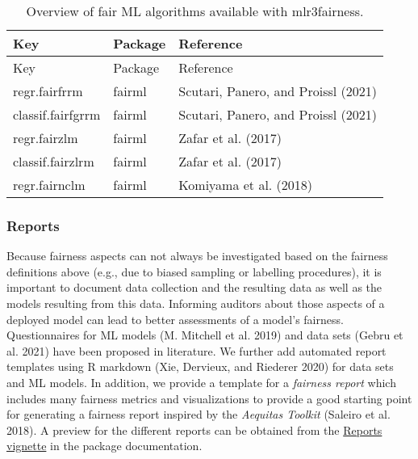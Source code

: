 \begin{longtable}[]{@{}lll@{}}
\caption{\label{tab:fairlearns} Overview of fair ML algorithms available with mlr3fairness.}\tabularnewline
\toprule\noalign{}
Key & Package & Reference \\
\midrule\noalign{}
\endfirsthead
\toprule\noalign{}
Key & Package & Reference \\
\midrule\noalign{}
\endhead
\bottomrule\noalign{}
\endlastfoot
regr.fairfrrm & fairml & Scutari, Panero, and Proissl (2021) \\
classif.fairfgrrm & fairml & Scutari, Panero, and Proissl (2021) \\
regr.fairzlm & fairml & Zafar et al. (2017) \\
classif.fairzlrm & fairml & Zafar et al. (2017) \\
regr.fairnclm & fairml & Komiyama et al. (2018) \\
\end{longtable}

\hypertarget{reports}{%
\subsubsection{Reports}\label{reports}}

Because fairness aspects can not always be investigated based on the fairness definitions above (e.g., due to biased sampling or labelling procedures), it is important to document data collection and the resulting data as well as the models resulting from this data.
Informing auditors about those aspects of a deployed model can lead to better assessments of a model's fairness.
Questionnaires for ML models (M. Mitchell et al. 2019) and data sets (Gebru et al. 2021) have been proposed in literature.
We further add automated report templates using R markdown (Xie, Dervieux, and Riederer 2020) for data sets and ML models.
In addition, we provide a template for a \emph{fairness report} which includes many fairness metrics and visualizations to provide a good starting point for generating a fairness report inspired by the \emph{Aequitas Toolkit} (Saleiro et al. 2018).
A preview for the different reports can be obtained from the \href{https://mlr3fairness.mlr-org.com/articles/reports-vignette.html}{Reports vignette} in the package documentation.

